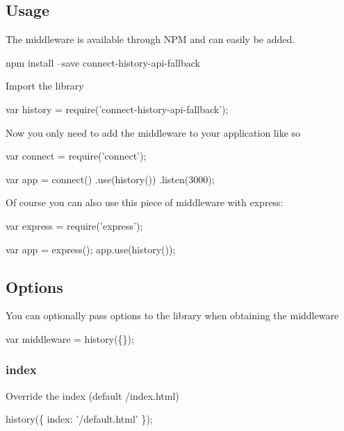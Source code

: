 \subsection*{Usage}

The middleware is available through N\+PM and can easily be added.


\begin{DoxyCode}
npm install --save connect-history-api-fallback
\end{DoxyCode}


Import the library


\begin{DoxyCode}
var history = require('connect-history-api-fallback');
\end{DoxyCode}


Now you only need to add the middleware to your application like so


\begin{DoxyCode}
var connect = require('connect');

var app = connect()
  .use(history())
  .listen(3000);
\end{DoxyCode}


Of course you can also use this piece of middleware with express\+:


\begin{DoxyCode}
var express = require('express');

var app = express();
app.use(history());
\end{DoxyCode}


\subsection*{Options}

You can optionally pass options to the library when obtaining the middleware


\begin{DoxyCode}
var middleware = history(\{\});
\end{DoxyCode}


\subsubsection*{index}

Override the index (default {\ttfamily /index.html})


\begin{DoxyCode}
history(\{
  index: '/default.html'
\});
\end{DoxyCode}


